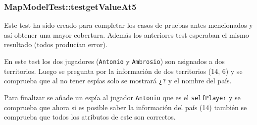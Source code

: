 \subsubsection {MapModelTest::testgetValueAt5}

Este test ha sido creado para completar los casos de pruebas antes mencionados y así obtener una mayor cobertura. Además los anteriores test esperaban el mismo resultado (todos producían error). 

En este test los dos jugadores (\texttt{Antonio} y \texttt{Ambrosio}) son asignados a dos territorios. Luego se pregunta por la información de dos territorios (14, 6) y se comprueba que al no tener espías solo se mostrará \texttt{¿?} y el nombre del país.

Para finalizar se añade un espía al jugador \texttt{Antonio} que es el \texttt{selfPlayer} y se comprueba que ahora si es posible saber la información del país (14) también se comprueba que  todos los atributos de este son correctos.





